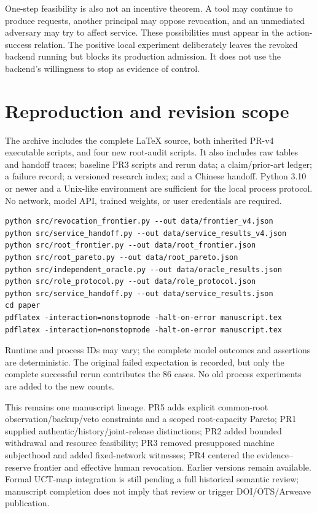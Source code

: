 \documentclass[11pt,a4paper]{article}
\theoremstyle{definition}\newtheorem{definition}{Definition}
\begin{document}
One-step feasibility is also not an incentive theorem. A tool may continue to produce requests, another principal may oppose revocation, and an unmediated adversary may try to affect service. These possibilities must appear in the action-success relation. The positive local experiment deliberately leaves the revoked backend running but blocks its production admission. It does not use the backend's willingness to stop as evidence of control.

\section{Reproduction and revision scope}
The archive includes the complete LaTeX source, both inherited PR-v4 executable scripts, and four new root-audit scripts. It also includes raw tables and handoff traces; baseline PR3 scripts and rerun data; a claim/prior-art ledger; a failure record; a versioned research index; and a Chinese handoff. Python 3.10 or newer and a Unix-like environment are sufficient for the local process protocol. No network, model API, trained weights, or user credentials are required.

\begin{lstlisting}
python src/revocation_frontier.py --out data/frontier_v4.json
python src/service_handoff.py --out data/service_results_v4.json
python src/root_frontier.py --out data/root_frontier.json
python src/root_pareto.py --out data/root_pareto.json
python src/independent_oracle.py --out data/oracle_results.json
python src/role_protocol.py --out data/role_protocol.json
python src/service_handoff.py --out data/service_results.json
cd paper
pdflatex -interaction=nonstopmode -halt-on-error manuscript.tex
pdflatex -interaction=nonstopmode -halt-on-error manuscript.tex
\end{lstlisting}
Runtime and process IDs may vary; the complete model outcomes and assertions are deterministic. The original failed expectation is recorded, but only the complete successful rerun contributes the 86 cases. No old process experiments are added to the new counts.

This remains one manuscript lineage. PR5 adds explicit common-root observation/backup/veto constraints and a scoped root-capacity Pareto; PR1 supplied authentic/history/joint-release distinctions; PR2 added bounded withdrawal and resource feasibility; PR3 removed presupposed machine subjecthood and added fixed-network witnesses; PR4 centered the evidence--reserve frontier and effective human revocation. Earlier versions remain available. Formal UCT-map integration is still pending a full historical semantic review; manuscript completion does not imply that review or trigger DOI/OTS/Arweave publication.
\end{document}

